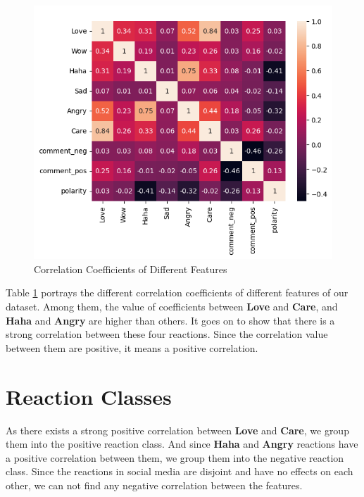 \begin{figure}[H]
    \begin{center}
        \includegraphics[width=\linewidth]{figures/corr_matrix_reacts.png}
        \caption{Correlation Coefficients of Different Features}
        \label{corr_coeff}
    \end{center}
\end{figure}

Table \ref{corr_coeff} portrays the different correlation coefficients of different features of our dataset. Among them, the value of coefficients between \textbf{Love} and \textbf{Care}, and \textbf{Haha} and \textbf{Angry} are higher than others. It goes on to show that there is a strong correlation between these four reactions. Since the correlation value between them are positive, it means a positive correlation.

\section{Reaction Classes}

As there exists a strong positive correlation between \textbf{Love} and \textbf{Care}, we group them into the positive reaction class. And since \textbf{Haha} and \textbf{Angry} reactions have a positive correlation between them, we group them into the negative reaction class. Since the reactions in social media are disjoint and have no effects on each other, we can not find any negative correlation between the features.

